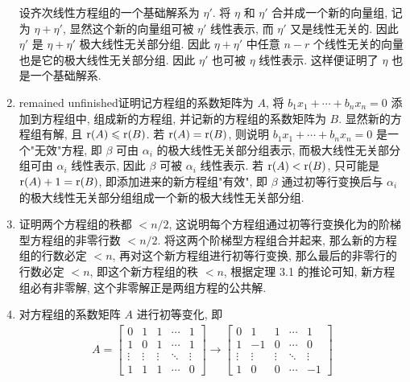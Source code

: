\begin{enumerate}
        设齐次线性方程组的一个基础解系为 $\eta'$. 将 $\eta$ 和 $\eta'$ 合并成一个新的向量组, 记为 $\eta + \eta'$, 显然这个新的向量组可被 $\eta'$ 线性表示, 而 $\eta'$ 又是线性无关的.
        因此 $\eta'$ 是 $\eta + \eta'$ 极大线性无关部分组. 因此 $\eta + \eta'$ 中任意 $n - r$ 个线性无关的向量也是它的极大线性无关部分组. 因此 $\eta'$ 也可被 $\eta$ 线性表示.
        这样便证明了 $\eta$ 也是一个基础解系.  
    \item %
        {\color{red} remained unfinished}{\heiti 证明}\quad 记方程组的系数矩阵为 $A$, 将 $b_1x_1 + \cdots + b_nx_n = 0$ 添加到方程组中, 组成新的方程组, 并记新的方程组的系数矩阵为 $B$.
        显然新的方程组有解, 且 $\mathrm{r}(A) \leqslant \mathrm{r}(B)$. 若 $\mathrm{r}(A) = \mathrm{r}(B)$, 则说明 $b_1x_1 + \cdots + b_nx_n = 0$ 是一个"无效"方程, 即 $\beta$ 可由 $\alpha_i$ 的极大线性无关部分组表示, 而极大线性无关部分组可由 $\alpha_i$ 线性表示,
        因此 $\beta$ 可被 $\alpha_i$ 线性表示. 若 $\mathrm{r}(A) < \mathrm{r}(B)$, 只可能是 $\mathrm{r}(A) + 1 = \mathrm{r}(B)$, 即添加进来的新方程组"有效", 即 $\beta$ 通过初等行变换后与 $\alpha_i$ 的极大线性无关部分组组成一个新的极大线性无关部分组.
    \item %
        {\heiti 证明}\quad 两个方程组的秩都 $< n/2$, 这说明每个方程组通过初等行变换化为的阶梯型方程组的非零行数 $< n / 2$.
        将这两个阶梯型方程组合并起来, 那么新的方程组的行数必定 $< n$, 再对这个新方程组进行初等行变换, 那么最后的非零行的行数必定 $< n$,
        即这个新方程组的秩 $< n$, 根据定理 3.1 的推论可知, 新方程组必有非零解, 这个非零解正是两组方程的公共解.
    \item %
        对方程组的系数矩阵 $A$ 进行初等变化, 即
        \begin{gather*}
            A =
            \begin{bmatrix}
                0 & 1 & 1 & \cdots & 1 \\
                1 & 0 & 1 & \cdots & 1 \\
                \vdots & \vdots & \vdots & \ddots & \vdots \\
                1 & 1 & 1 & \cdots & 0
            \end{bmatrix}
            \rightarrow
            \begin{bmatrix}
                0 & 1 & 1 & \cdots & 1 \\
                1 & -1 & 0 & \cdots & 0 \\
                \vdots & \vdots & \vdots & \ddots & \vdots \\
                1 & 0 & 0 & \cdots & -1
            \end{bmatrix}

\end{gather*}
\end{enumerate}
